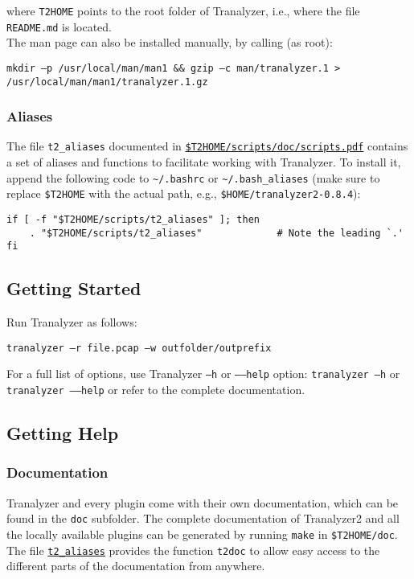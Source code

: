 where {\tt T2HOME} points to the root folder of Tranalyzer, i.e., where the file {\tt README.md} is located.\\

The man page can also be installed manually, by calling (as root):

\begin{center}
    {\tt mkdir --p /usr/local/man/man1 \&\& gzip --c man/tranalyzer.1 > /usr/local/man/man1/tranalyzer.1.gz}\\
\end{center}

\subsubsection{Aliases}\label{s:aliases}
The file {\tt t2\_aliases} documented in \href{../../scripts/doc/scripts.pdf}{\tt \$T2HOME/scripts/doc/scripts.pdf} contains a set of aliases and functions to facilitate working with Tranalyzer.
To install it, append the following code to {\tt\textasciitilde{}/.bashrc} or {\tt\textasciitilde{}/.bash\_aliases} (make sure to replace {\tt\$T2HOME} with the actual path, e.g., {\tt\$HOME/tranalyzer2-0.8.4}):
\begin{lstlisting}
if [ -f "$T2HOME/scripts/t2_aliases" ]; then
    . "$T2HOME/scripts/t2_aliases"             # Note the leading `.'
fi
\end{lstlisting}

\subsection{Getting Started}

Run Tranalyzer as follows:
\begin{center}
    {\tt tranalyzer --r file.pcap --w outfolder/outprefix}
\end{center}
For a full list of options, use Tranalyzer {\tt --h} or {\tt --{}--help} option: {\tt tranalyzer --h} or {\tt tranalyzer --{}--help} or refer to the complete documentation.

\subsection{Getting Help}

\subsubsection{Documentation}
Tranalyzer and every plugin come with their own documentation, which can be found in the {\tt doc} subfolder. The complete documentation of Tranalyzer2 and all the locally available plugins can be generated by running {\tt make} in {\tt \$T2HOME/doc}. The file \hyperref[s:aliases]{\tt t2\_aliases} provides the function {\tt t2doc} to allow easy access to the different parts of the documentation from anywhere.

